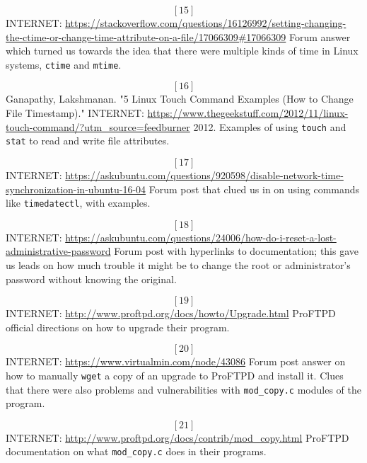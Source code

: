 \[[15]\]  INTERNET: \url{https://stackoverflow.com/questions/16126992/setting-changing-the-ctime-or-change-time-attribute-on-a-file/17066309\#17066309}%
Forum answer which turned us towards the idea that there were multiple kinds of time in Linux systems, \texttt{ctime} and \texttt{mtime}.

\[[16]\]  Ganapathy, Lakshmanan. "5 Linux Touch Command Examples (How to Change File Timestamp)." INTERNET: \url{https://www.thegeekstuff.com/2012/11/linux-touch-command/?utm\_source=feedburner} 2012.
Examples of using \texttt{touch} and \texttt{stat} to read and write file attributes.

\[[17]\]  INTERNET: \url{https://askubuntu.com/questions/920598/disable-network-time-synchronization-in-ubuntu-16-04}
Forum post that clued us in on using commands like \texttt{timedatectl}, with examples.

\[[18]\]  INTERNET: \url{https://askubuntu.com/questions/24006/how-do-i-reset-a-lost-administrative-password}
Forum post with hyperlinks to documentation; this gave us leads on how much trouble it might be to change the root or administrator's \gls{password} without knowing the original.

\[[19]\]  INTERNET: \url{http://www.proftpd.org/docs/howto/Upgrade.html}
ProFTPD official directions on how to upgrade their program.

\[[20]\]  INTERNET: \url{https://www.virtualmin.com/node/43086}
Forum post answer on how to manually \texttt{wget} a copy of an upgrade to ProFTPD and install it.  Clues that there were also problems and vulnerabilities with \texttt{mod\_copy.c} modules of the program.

\[[21]\]  INTERNET: \url{http://www.proftpd.org/docs/contrib/mod\_copy.html}
ProFTPD documentation on what \texttt{mod\_copy.c} does in their programs.

